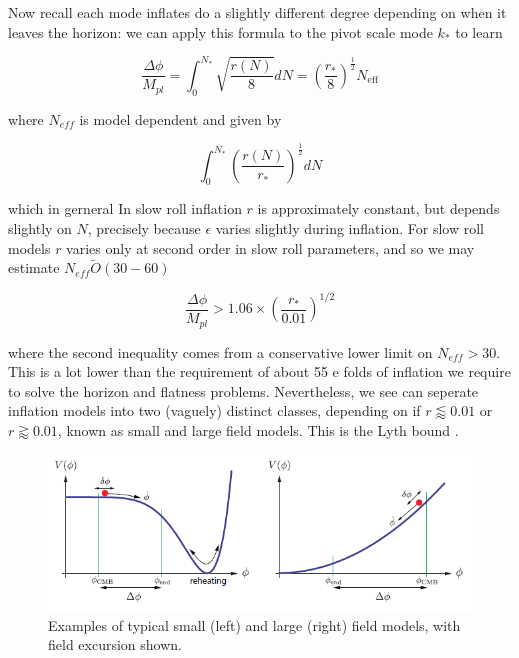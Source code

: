 \documentclass[a4paper,10pt]{article}
\newcommand{\Mp}{M_{pl}}
\newcommand{\half}{\frac{1}{2}}
\begin{document}
Now recall each mode inflates do a slightly different degree depending on when it leaves the horizon: we can apply this formula to the pivot scale mode $k_*$ to learn 

\begin{equation}
\frac{\Delta \phi}{\Mp} =  \int_0^{N_*} \sqrt{\frac{r(N)}{8}} dN  = (\frac{r_*}{8})^\half N_{\text{eff}}
\end{equation}

where $N_{eff}$ is model dependent and given by

\begin{equation}
\int_0^{N_*}(\frac{r(N)}{r_*})^\half dN
\end{equation}


which in gerneral In slow roll inflation $r$ is approximately constant, but depends slightly on $N$, precisely because $\epsilon$ varies slightly during inflation. For slow roll models $r$ varies only at second order in slow roll parameters, and so we may estimate $N_{eff} \tilde O(30-60)$

\begin{equation}
\frac{\Delta \phi}{\Mp} > 1.06 \times (\frac{r_*}{0.01})^{1/2}
\end{equation}

where the second inequality comes from a conservative lower limit on $N_{eff} > 30$. This is a lot lower than the requirement of about 55 e folds of inflation we require to solve the horizon and flatness problems. Nevertheless, we see can seperate inflation models into two (vaguely) distinct classes, depending on if $r\lessapprox 0.01$ or $r\gtrapprox 0.01$, known as small and large field models. This is the Lyth bound \cite{Lyth}. \\


\begin{figure}[h]
  \includegraphics[width=\linewidth]{smalllargefield.png}
  \caption{Examples of typical small (left) and large (right) field models, with field excursion shown.}
\end{figure}
\end{document}
